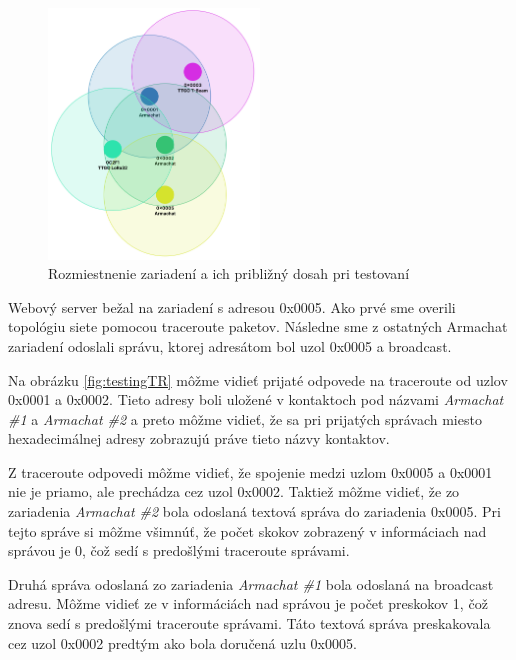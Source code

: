 \documentclass[slovak,master]{diploma}
\begin{document}
\begin{figure}[h!]
  \centering
  \includegraphics[width=0.5\textwidth]{Figures/topology.png}
  \caption{Rozmiestnenie zariadení a ich približný dosah  pri testovaní}
  \label{fig:topology}
\end{figure}

\newpage
Webový server bežal na zariadení s adresou 0x0005. Ako prvé sme overili topológiu siete pomocou traceroute paketov. 
Následne sme z ostatných Armachat zariadení odoslali správu, ktorej adresátom bol uzol 0x0005 a broadcast.

Na obrázku \ref{fig:testingTR} môžme vidieť prijaté odpovede na traceroute od uzlov 0x0001 a 0x0002. Tieto adresy boli uložené 
v kontaktoch pod názvami \emph{Armachat \#1} a \emph{Armachat \#2} a preto môžme vidieť, že sa pri prijatých správach miesto hexadecimálnej adresy 
zobrazujú práve tieto názvy kontaktov.

Z traceroute odpovedi môžme vidieť, že spojenie medzi uzlom 0x0005 a 0x0001 nie je priamo, ale prechádza cez uzol 0x0002. Taktiež môžme vidieť, 
že zo zariadenia \emph{Armachat \#2} bola odoslaná textová správa do zariadenia 0x0005. Pri tejto správe si môžme všimnúť, že počet skokov 
zobrazený v informáciach nad správou je 0, čož sedí s predošlými traceroute správami.

Druhá správa odoslaná zo zariadenia \emph{Armachat \#1} bola odoslaná na broadcast adresu. Môžme vidieť ze v informáciách nad správou je počet 
preskokov 1, čož znova sedí s predošlými traceroute správami. Táto textová správa preskakovala cez uzol 0x0002 predtým ako bola doručená 
uzlu 0x0005.
\end{document}
